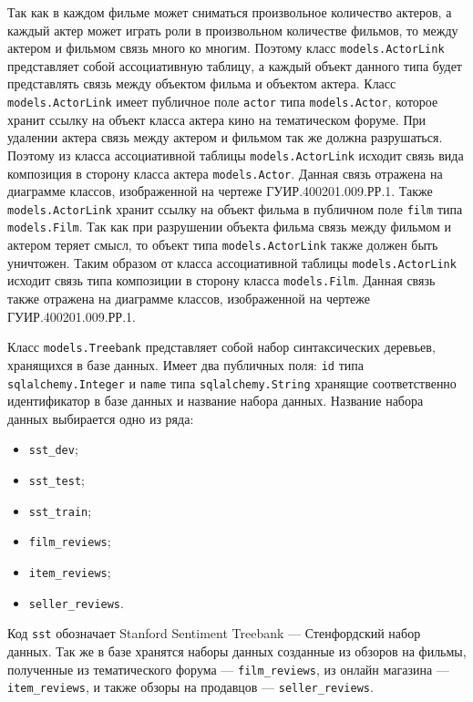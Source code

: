 Так как в каждом фильме может сниматься произвольное количество актеров, а каждый актер может играть роли в произвольном количестве фильмов, то между актером и фильмом связь много ко многим. Поэтому класс \texttt{mo\-dels.ActorLink} представляет собой ассоциативную таблицу, а каждый объект данного типа будет представлять связь между объектом фильма и объектом актера. Класс \texttt{mo\-dels.ActorLink} имеет публичное поле \texttt{actor} типа \texttt{mo\-dels.Actor}, которое хранит ссылку на объект класса актера кино на тематическом форуме. При удалении актера связь между актером и фильмом так же должна разрушаться. Поэтому из класса ассоциативной таблицы \texttt{mo\-dels.\-ActorLink} исходит связь вида композиция в сторону класса актера \texttt{mo\-dels.\-Actor}. Данная связь отражена на диаграмме классов, изображенной на чертеже ГУИР.400201.009.РР.1. Также \texttt{mo\-dels.ActorLink} хранит ссылку на объект фильма в публичном поле \texttt{film} типа \texttt{mo\-dels.Film}. Так как при разрушении объекта фильма связь между фильмом и актером теряет смысл, то объект типа \texttt{mo\-dels.ActorLink} также должен быть уничтожен. Таким образом от класса ассоциативной таблицы \texttt{mo\-dels.Actor\-Link} исходит связь типа композиции в сторону класса \texttt{mo\-dels.Film}. Данная связь также отражена на диаграмме классов, изображенной на чертеже ГУИР.400201.009.РР.1.

Класс \texttt{mo\-dels.Treebank} представляет собой набор синтаксических деревьев, хранящихся в базе данных. Имеет два публичных поля: \texttt{id} типа \texttt{sqlalchemy.Integer} и \texttt{name} типа \texttt{sqlalchemy.String} хранящие соответственно идентификатор в базе данных и название набора данных. Название набора данных выбирается одно из ряда:
\begin{itemize}
\item \texttt{sst\_dev};
\item \texttt{sst\_test};
\item \texttt{sst\_train};
\item \texttt{film\_reviews};
\item \texttt{item\_reviews};
\item \texttt{seller\_reviews}.
\end{itemize}
Код \texttt{sst} обозначает Stanford Sentiment Treebank --- Стенфордский набор данных. Так же в базе хранятся наборы данных созданные из обзоров на фильмы, полученные из тематического форума --- \texttt{film\_reviews}, из онлайн магазина --- \texttt{item\_reviews}, и также обзоры на продавцов --- \texttt{seller\_reviews}.

